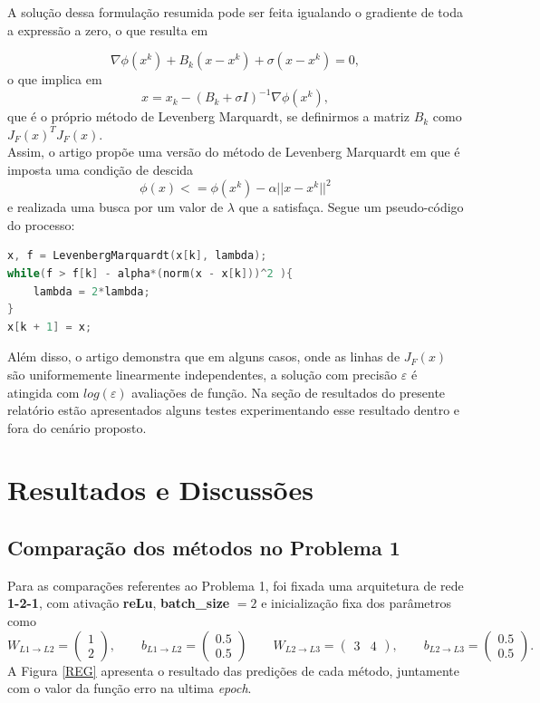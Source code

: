 \documentclass[11pt]{article}
\begin{document}
\noindent
A solução dessa formulação resumida pode ser feita igualando o gradiente de toda a expressão a zero, o que resulta em 

$$\nabla \phi(x^k) + B_k (x - x^k) + \sigma(x - x^k) = 0, $$ 
o que implica em 
$$x = x_k - (B_k + \sigma I)^{-1} \nabla \phi(x^k), $$ que é o próprio método de Levenberg Marquardt, se definirmos a matriz $B_k$ como $J_{F}(x)^T J_{F}(x)$.\\ 


\noindent
Assim, o artigo propõe uma versão do método de Levenberg Marquardt em que é imposta uma condição de descida
$$\phi(x) <= \phi(x^k) - \alpha ||x - x^k||^2$$ e realizada uma busca por um valor de $\lambda$ que a satisfaça. Segue um pseudo-código do processo:

\begin{lstlisting}[language=C, caption=Levenberg Marquardt com busca linear]
x, f = LevenbergMarquardt(x[k], lambda);
while(f > f[k] - alpha*(norm(x - x[k]))^2 ){
	lambda = 2*lambda;
}
x[k + 1] = x;
\end{lstlisting}


\noindent
Além disso, o artigo demonstra\supercite{bmLS} que em alguns casos, onde as linhas de $J_F(x)$ são uniformemente linearmente independentes, a solução com precisão $\varepsilon$ é atingida com $log (\varepsilon)$ avaliações de função. Na seção de resultados do presente relatório estão apresentados alguns testes experimentando esse resultado dentro e fora do cenário proposto.
\newpage
\section{Resultados e Discussões}
\subsection*{Comparação dos métodos no Problema 1}
Para as comparações referentes ao Problema 1, foi fixada uma arquitetura de rede \textbf{1-2-1}, com ativação \textbf{reLu}, \textbf{batch\_size} $ = 2$ e inicialização fixa dos parâmetros como 
$$W_{L1\rightarrow L2} = \begin{pmatrix} 1 \\ 2\end{pmatrix}, \qquad b_{L1\rightarrow L2} = \begin{pmatrix} 0.5 \\ 0.5\end{pmatrix}\qquad W_{L2\rightarrow L3} = \begin{pmatrix} 3 & 4\end{pmatrix}, \qquad b_{L2\rightarrow L3} = \begin{pmatrix} 0.5 \\ 0.5\end{pmatrix}.$$ 
A Figura \ref{REG} apresenta o resultado das predições de cada método, juntamente com o valor da função erro na ultima \textit{epoch}.
\end{document}
